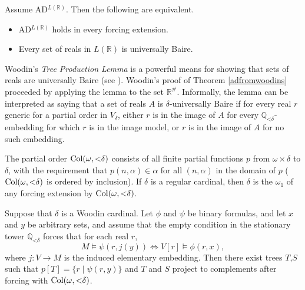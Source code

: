 \documentclass{book}%
\newcommand{\less}{\mathord{<}}
\begin{document}
\begin{theorem} Assume {\rm AD}$^{L(\mathbb{R})}$. Then the following are
equivalent.
\begin{itemize}
\item {\rm AD}$^{L(\mathbb{R})}$ holds in every
forcing extension.
\item Every set of reals in $L(\mathbb{R})$ is universally Baire.
\end{itemize}
\end{theorem}



Woodin's \emph{Tree Production Lemma} is a powerful means for
showing that sets of reals are universally Baire (see
\cite{Larson:stationary}). Woodin's proof of Theorem \ref{adfromwoodins} proceeded by
applying the lemma to the
set $\mathbb{R}^{\#}$. Informally, the lemma can be interpreted as saying that a set of reals $A$ is
$\delta$-universally Baire if for every real $r$ generic for a partial order in $V_{\delta}$, either
$r$ is in the image of $A$ for every $\mathbb{Q}_{\less\delta}$-embedding for which $r$ is in the image model,
or $r$ is in the image of $A$ for no such embedding.

The partial order ${\rm Col}(\omega, \less\delta)$\index{${\rm Col}(\omega, \less\delta)$} consists of all finite partial functions $p$ from
$\omega \times \delta$ to $\delta$, with the requirement that $p(n,\alpha) \in \alpha$ for all $(n,\alpha)$
in the domain of $p$ (${\rm Col}(\omega, \less\delta)$ is ordered by inclusion). If $\delta$ is a regular cardinal, then $\delta$ is the $\omega_{1}$
of any forcing extension by ${\rm Col}(\omega, \less\delta)$.


\begin{theorem}
Suppose that $\delta$ is a Woodin cardinal. Let
$\phi$ and $\psi$ be binary formulas, and let $x$ and $y$ be
arbitrary sets, and assume that the empty condition in the
stationary tower $\mathbb{Q}_{\less\delta}$ forces that for each
real $r$,
$$M \models \psi(r,j(y)) \Leftrightarrow V[r] \models \phi(r,x),$$
where $j \colon V \to M$ is the induced elementary embedding. Then
there exist trees $T$,$S$ such that $p[T] = \{ r \mid \psi(r,y)\}$
and $T$ and $S$ project to complements after forcing with
${\rm Col}(\omega, \less\delta)$.
\end{theorem}
\end{document}
